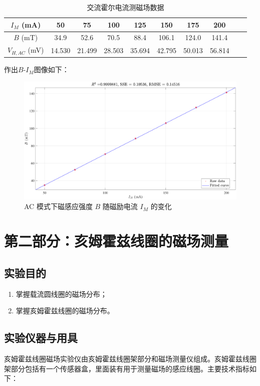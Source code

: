 \documentclass[UTF8]{article}
\theoremstyle{MyLineTheoremStyle} %
\theoremstyle{MyBlockTheoremStyle} %
\theoremstyle{MySubsubsectionStyle} %
\begin{document}
\begin{table}[H]\centering
    \caption{交流霍尔电流测磁场数据}
    \label{交流霍尔电流测磁场数据}
\begin{tabular}{cccccccccc}\toprule
    $I_M$ (mA) &50	    &75	    &100	&125	&150	&175	&200    \\
    \midrule
    $B$ (mT) & 34.9	&52.6	&70.5	&88.4	&106.1	&124.0	&141.4  \\
    $V_{H, AC}$ (mV) & 14.530	&21.499	&28.503	&35.694	&42.795	&50.013	&56.814 \\
    \bottomrule
\end{tabular}
\end{table}
作出$ B$-$I_M $图像如下：
\begin{figure}[H]\centering
    \includegraphics[width=0.9\columnwidth]{assets/1/5.pdf}
    \caption{AC 模式下磁感应强度 $B$ 随磁励电流 $I_M$ 的变化}
\end{figure}


\section{第二部分：亥姆霍兹线圈的磁场测量}


\subsection{实验目的}
\begin{enumerate}
\item 掌握载流圆线圈的磁场分布；
\item 掌握亥姆霍兹线圈的磁场分布。
\end{enumerate}


\subsection{实验仪器与用具}
亥姆霍兹线圈磁场实验仪由亥姆霍兹线圈架部分和磁场测量仪组成。亥姆霍兹线圈架部分包括有一个传感器盒，里面装有用于测量磁场的感应线圈。主要技术指标如下：
\end{document}
